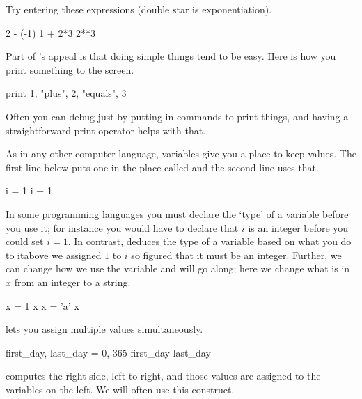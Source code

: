 Try entering these expressions (double star is exponentiation).
\begin{pythonoutput}
2 - (-1)
1 + 2*3
2**3  
\end{pythonoutput}

Part of \python's appeal is that doing simple things tend to be easy.
Here is how you print something to the screen.
\begin{pythonoutput}
print 1, "plus", 2, "equals", 3
\end{pythonoutput}
Often you can debug just by putting in commands to print things, 
and having a straightforward print operator helps with that. 

As in any other computer language, variables give you a place to keep values.
The first line below puts one in the place called 
and the second line uses that.
\begin{pythonoutput}
i = 1
i + 1
\end{pythonoutput}
In some programming languages you must declare the `type' of a variable
before you use it; for instance you would have to declare 
that $i$ is an integer before you could set $i=1$.
In contrast, \python{} deduces the type of a variable 
based on what you do to it\Dash above we assigned $1$ to $i$ 
so \python{} figured that it must be an integer.
Further, we can change how we use the variable and \python{} will 
go along; here we change what is in $x$ from an integer to a string.
\begin{pythonoutput}
x = 1
x
x = 'a'
x
\end{pythonoutput}

\python{} lets you assign multiple values simultaneously.
\begin{pythonoutput}
first_day, last_day = 0, 365
first_day
last_day   
\end{pythonoutput}
\noindent
\python{} computes the right side, left to right, and those values are
assigned to the variables on the left.
We will often use this construct.

